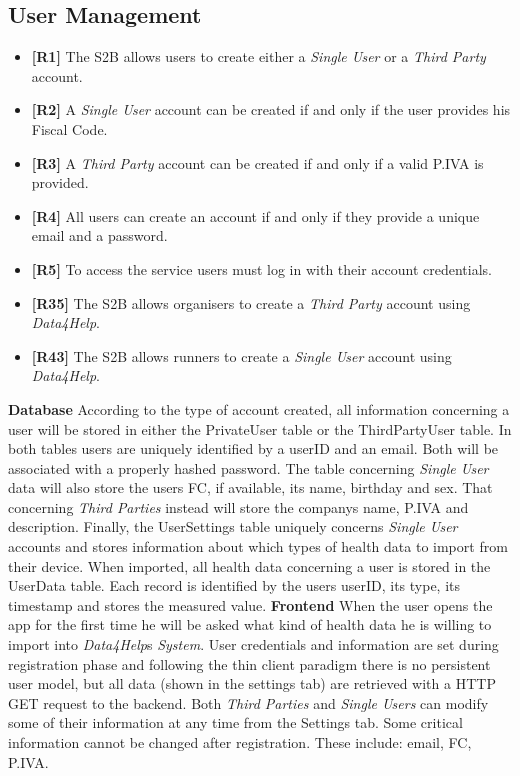 \documentclass[titlepage]{article}
\begin{document}
	
	\subsection{User Management}
	\begin{itemize}
		\item {\bf [R1]} The S2B allows users to create either a {\it Single User} or a {\it Third Party} account. 
		\item {\bf [R2]} A {\it Single User} account can be created if and only if the user provides his Fiscal Code. 
		\item {\bf [R3]} A {\it Third Party} account can be created if and only if a valid P.IVA is provided. 
		\item {\bf [R4]} All users can create an account if and only if they provide a unique email and a password. 
		\item {\bf [R5]} To access the service users must log in with their account credentials.
		\item {\bf [R35]} The S2B allows organisers to create a {\it Third Party} account using {\it Data4Help}.
		\item {\bf [R43]} The S2B allows runners to create a {\it Single User} account using {\it Data4Help}.
	\end{itemize} \noindent			
	{\bf Database} \newline
	According to the type of account created, all information concerning a user will be stored in either the PrivateUser table or the ThirdPartyUser table. In both tables users are uniquely identified by a userID and an email. Both will be associated with a properly hashed password. The table concerning {\it Single User} data will also store the user\textsc{}s FC, if available, its name, birthday and sex. That concerning {\it Third Parties} instead will store the company\textsc{}s name, P.IVA and description. 
	Finally, the UserSettings table uniquely concerns {\it Single User} accounts and stores information about which types of health data to import from their device. When imported, all health data concerning a user is stored in the UserData table. Each record is identified by the user\textsc{}s userID, its type, its timestamp and stores the measured value.
	\newline
	\newline
	\noindent
	{\bf Frontend} \newline
	When the user opens the app for the first time he will be asked what kind of health data he is willing to import into {\it Data4Help}\textsc{}s {\it System}. User credentials and information are set during registration phase and following the thin client paradigm there is no persistent user model, but all data (shown in the settings tab) are retrieved with a HTTP GET request to the backend. Both {\it Third Parties} and {\it Single Users} can modify some of their information at any time from the Settings tab. Some critical information cannot be changed after registration. These include: email, FC, P.IVA. 
\end{document}
